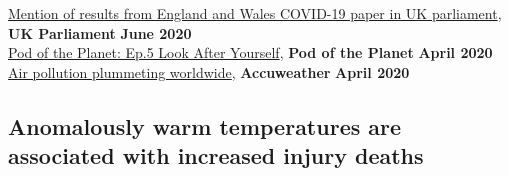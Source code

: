 \href{https://twitter.com/rmiparks/status/1268082491530850305}{Mention of results from England and Wales COVID-19 paper in UK parliament}, \textbf{UK Parliament} \hfill \textbf{June 2020}\\
\href{https://open.spotify.com/episode/2D9VJnsJ1dix4oURbusan2}{Pod of the Planet: Ep.5 Look After Yourself}, \textbf{Pod of the Planet} \hfill \textbf{April 2020}\\
\href{https://www.accuweather.com/en/videos/air-pollution-plummeting-worldwide/D6FnwOv3}{Air pollution plummeting worldwide}, \textbf{Accuweather} \hfill \textbf{April 2020}

\subsection*{Anomalously warm temperatures are associated with increased injury deaths}


